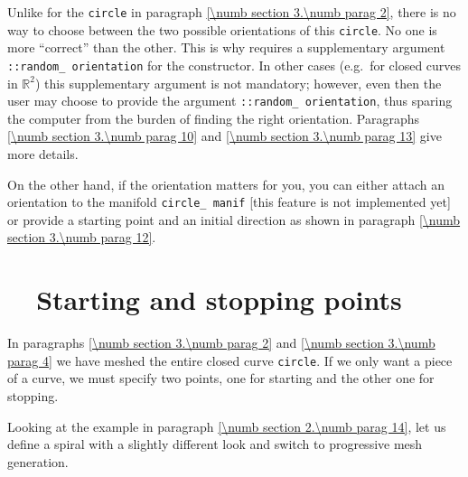 Unlike for the {\small\tt circle} in paragraph \ref{\numb section 3.\numb parag 2},
there is no way to choose between the two possible orientations of this {\small\tt circle}.
No one is more ``correct'' than the other.
This is why {\maniFEM} requires a supplementary argument
{\small\tt {}::random\_\,orientation}
for the {\small\tt {}} constructor.
In other cases (e.g.\ for closed curves in $ \mathbb{R}^2 $) this supplementary argument
is not mandatory; however, even then the user may choose to provide the argument
{\small\tt {}::random\_\,orientation}, thus sparing the computer from the burden of
finding the right orientation.
Paragraphs \ref{\numb section 3.\numb parag 10} and \ref{\numb section 3.\numb parag 13}
give more details.

On the other hand, if the orientation matters for you, you can either attach an orientation
to the manifold {\small\tt circle\_\,manif} [this feature is not implemented yet]
or provide a starting point and an initial direction as shown in paragraph
\ref{\numb section 3.\numb parag 12}.


\section{~~Starting and stopping points}\label{\numb section 3.\numb parag 5}

In paragraphs \ref{\numb section 3.\numb parag 2} and \ref{\numb section 3.\numb parag 4}
we have meshed the entire closed curve {\small\tt circle}.
If we only want a piece of a curve, we must specify two points, one for starting and
the other one for stopping.

Looking at the example in paragraph \ref{\numb section 2.\numb parag 14}, let us define a
spiral with a slightly different look and switch to progressive mesh generation.

